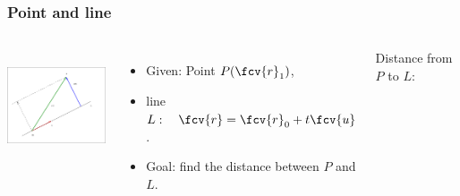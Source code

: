\begin{frame}
\frametitle{Point and line}

\begin{columns}
        \includegraphics[height=1.3in]{../../modules/vectors/pictures/ok-distance_point_line.eps}
\begin{itemize}
\item Given: Point $P(\fcv{r}_1)$, 
\item line $L: \quad \fcv{r}=\fcv{r}_0+t\fcv{u}$.
\item Goal: find the distance between $P$ and $L$.
\end{itemize}

\alert<1->{Distance} from $P$ to $L$:

\end{columns}
\end{frame}